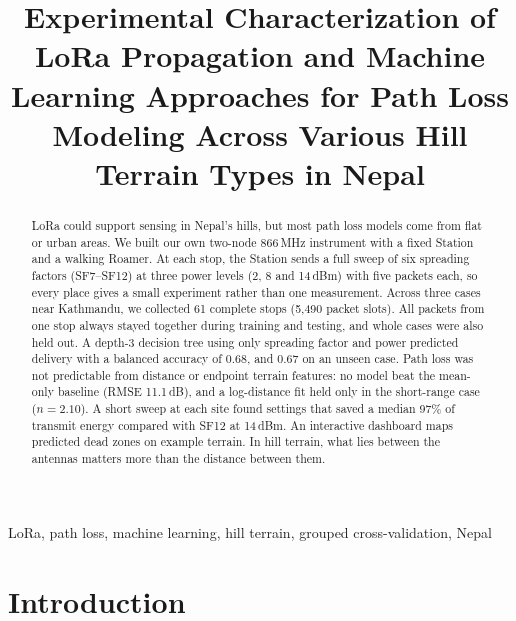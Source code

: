 \documentclass[conference]{IEEEtran}
\newcommand{\dBm}{\,dBm\xspace}
\newcommand{\dB}{\,dB\xspace}
\begin{document}
\title{Experimental Characterization of LoRa Propagation and Machine Learning Approaches for Path Loss Modeling Across Various Hill Terrain Types in Nepal}

\author{
}

\maketitle

\begin{abstract}
LoRa could support sensing in Nepal's hills, but most path loss models come from flat or urban areas. We built our own two-node 866\,MHz instrument with a fixed Station and a walking Roamer. At each stop, the Station sends a full sweep of six spreading factors (SF7--SF12) at three power levels (2, 8 and 14\dBm) with five packets each, so every place gives a small experiment rather than one measurement. Across three cases near Kathmandu, we collected 61 complete stops (5,490 packet slots). All packets from one stop always stayed together during training and testing, and whole cases were also held out. A depth-3 decision tree using only spreading factor and power predicted delivery with a balanced accuracy of 0.68, and 0.67 on an unseen case. Path loss was not predictable from distance or endpoint terrain features: no model beat the mean-only baseline (RMSE 11.1\dB), and a log-distance fit held only in the short-range case ($n = 2.10$). A short sweep at each site found settings that saved a median 97\% of transmit energy compared with SF12 at 14\dBm. An interactive dashboard maps predicted dead zones on example terrain. In hill terrain, what lies between the antennas matters more than the distance between them.
\end{abstract}

\begin{IEEEkeywords}
LoRa, path loss, machine learning, hill terrain, grouped cross-validation, Nepal
\end{IEEEkeywords}

\section{Introduction}
\end{document}
